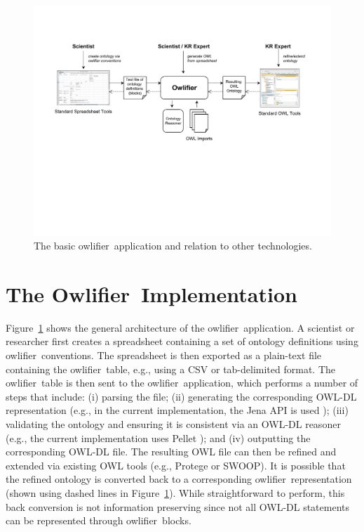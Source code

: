 \documentclass[5p,authoryear]{elsarticle}
\newcommand{\Owlifier}{\textsf{Owlifier}}
\newcommand{\owlifier}{\textsf{owlifier}}
\newcommand{\figref}[1]{Figure~\ref{#1}}
\begin{document}
\begin{figure}
  \centering
  \includegraphics[scale=.75]{architecture.pdf}
  \caption{The basic \owlifier\ application and relation to other
    technologies.}
  \label{fig:owlifier}
\end{figure}


\section{The \Owlifier\ Implementation}
\label{sec:implementation}

\figref{fig:owlifier} shows the general architecture of the \owlifier\
application. A scientist or researcher first creates a spreadsheet
containing a set of ontology definitions using \owlifier\ conventions.
The spreadsheet is then exported as a plain-text file containing the
\owlifier\ table, e.g., using a CSV or tab-delimited format. The
\owlifier\ table is then sent to the \owlifier\ application, which
performs a number of steps that include: (i) parsing the file; (ii)
generating the corresponding OWL-DL representation (e.g., in the
current implementation, the Jena API is used \citep{carroll04:_jena});
(iii) validating the ontology and ensuring it is consistent via an
OWL-DL reasoner (e.g., the current implementation uses Pellet
\citep{sirin07:_pellet}); and (iv) outputting the corresponding OWL-DL
file. The resulting OWL file can then be refined and extended via
existing OWL tools (e.g., Protege or SWOOP). It is possible that the
refined ontology is converted back to a corresponding \owlifier\
representation (shown using dashed lines in
\figref{fig:owlifier}). While straightforward to perform, this back
conversion is not information preserving since not all OWL-DL
statements can be represented through \owlifier\ blocks.
\end{document}
